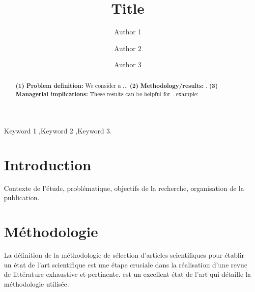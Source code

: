 \documentclass[review]{elsarticle}
\begin{document}


\begin{frontmatter}
\title{Title}

\author[label1]{Author 1}
    \address[label1]{IMT Mines Alès, Alès, France\\
    \href{mailto:a@mines-ales.fr}{\{author1;author2\}@mines-ales.org}\\
    }
 
\author[label1]{Author 2}
    
\author[label2]{Author 3}
    \address[label2]{IMT Mines Alès, Alès, France \\
    \href{mailto:b@mines-ales.fr}{c@mines-ales.fr} 
    } 




\begin{abstract}
    {\bf(1) Problem definition:} We consider a ... {\bf(2) Methodology/results:} . {\bf(3) Managerial implications:} These results can be helpful for .
    example: \cite{bortolini_motion_2020}
\end{abstract}

\begin{keyword}
    Keyword 1 \sep Keyword 2 \sep Keyword 3.
\end{keyword}

\end{frontmatter}

\linenumbers

\section{Introduction}\label{sec:Intro}
Contexte de l'étude, problématique, objectifs de la recherche, organisation de la publication.
\section{Méthodologie}
La définition de la méthodologie de sélection d'articles scientifiques pour établir un état de l'art scientifique est une étape cruciale dans la réalisation d'une revue de littérature exhaustive et pertinente. \cite{su15097339} est un excellent état de l'art qui détaille la méthodologie utilisée.
\end{document}
